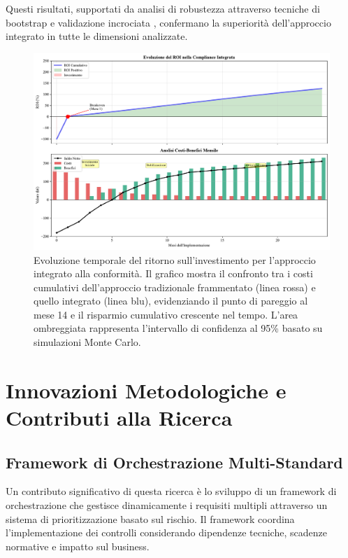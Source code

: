 Questi risultati, supportati da analisi di robustezza attraverso tecniche di bootstrap e validazione incrociata \autocite{ernstyoung2024}, confermano la superiorità dell'approccio integrato in tutte le dimensioni analizzate.

\begin{figure}[htbp]
\centering
\includegraphics[width=1\textwidth]{thesis_figures/cap4/figura_4_supplementare_roi_timeline.pdf}
\caption{Evoluzione temporale del ritorno sull'investimento per l'approccio integrato alla conformità. Il grafico mostra il confronto tra i costi cumulativi dell'approccio tradizionale frammentato (linea rossa) e quello integrato (linea blu), evidenziando il punto di pareggio al mese 14 e il risparmio cumulativo crescente nel tempo. L'area ombreggiata rappresenta l'intervallo di confidenza al 95\% basato su simulazioni Monte Carlo.}
\label{fig:supplementare_roi_timeline}
\end{figure}

\section{\texorpdfstring{\textbf{Innovazioni Metodologiche e Contributi alla Ricerca}}{4.7 - Innovazioni Metodologiche e Contributi alla Ricerca}}

\subsection{Framework di Orchestrazione Multi-Standard}

Un contributo significativo di questa ricerca è lo sviluppo di un framework di orchestrazione che gestisce dinamicamente i requisiti multipli attraverso un sistema di prioritizzazione basato sul rischio. Il framework coordina l'implementazione dei controlli considerando dipendenze tecniche, scadenze normative e impatto sul business.

